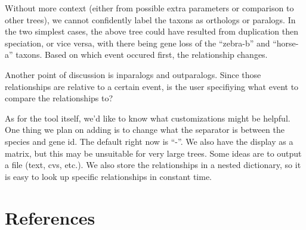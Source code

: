 \documentclass[
  11pt,
  letterpaper,
  oneside]{book}
\newlength{\cslhangindent}
\newlength{\cslentryspacingunit} %
\newenvironment{CSLReferences}[2] %
 {%
  \setlength{\parindent}{0pt}
  \ifodd #1
  \let\oldpar\par
  \def\par{\hangindent=\cslhangindent\oldpar}
  \fi
  \setlength{\parskip}{#2\cslentryspacingunit}
 }%
 {}
\begin{document}
Without more context (either from possible extra parameters or
comparison to other trees), we cannot confidently label the taxons as
orthologs or paralogs. In the two simplest cases, the above tree could
have resulted from duplication then speciation, or vice versa, with
there being gene loss of the ``zebra-b'' and ``horse-a'' taxons. Based
on which event occured first, the relationship changes.

Another point of discussion is inparalogs and outparalogs. Since those
relationships are relative to a certain event, is the user specifiying
what event to compare the relationships to?

As for the tool itself, we'd like to know what customizations might be
helpful. One thing we plan on adding is to change what the separator is
between the species and gene id. The default right now is ``-''. We also
have the display as a matrix, but this may be unsuitable for very large
trees. Some ideas are to output a file (text, cvs, etc.). We also store
the relationships in a nested dictionary, so it is easy to look up
specific relationships in constant time.


\hypertarget{references}{%
\chapter*{References}\label{references}}


\hypertarget{refs}{}
\begin{CSLReferences}{0}{0}
\end{CSLReferences}


\backmatter
\end{document}
